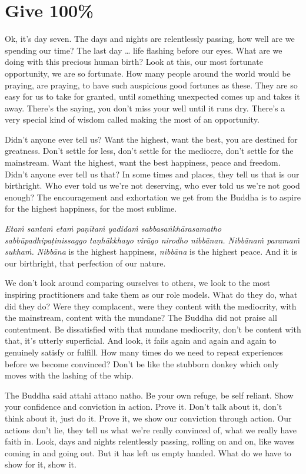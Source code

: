 \documentclass[12pt,openany]{book}
\begin{document}
\chapter*{Give 100\%}

Ok, it's day seven. The days and nights are relentlessly passing, how well are we spending our time? The last day … life flashing before our eyes. What are we doing with this precious human birth? Look at this, our most fortunate opportunity, we are so fortunate. How many people around the world would be praying, are praying, to have such auspicious good fortunes as these. They are so easy for us to take for granted, until something unexpected comes up and takes it away. There’s the saying, you don't miss your well until it runs dry. There's a very special kind of wisdom called making the most of an opportunity. 

Didn't anyone ever tell us? Want the highest, want the best, you are destined for greatness. Don't settle for less, don't settle for the mediocre, don’t settle for the mainstream. Want the highest, want the best happiness, peace and freedom. Didn’t anyone ever tell us that? In some times and places, they tell us that is our birthright. Who ever told us we're not deserving, who ever told us we're not good \linebreak enough? The encouragement and exhortation we get from the Buddha is to aspire for the highest happiness, for the most sublime.

\textit{Etaṁ santaṁ etaṁ paṇītaṁ yadidaṁ sabbasaṅkhārasamatho sabbūpadhipaṭinissaggo taṇhākkhayo virāgo nirodho nibbānan. Nibbānaṁ paramaṁ sukhaṁ. Nibbāna} is the highest happiness, \textit{nibbāna} is the highest peace. And it is our birthright, that perfection of our nature.

We don't look around comparing ourselves to others, we look to the most inspiring practitioners and take them as our role models. What do they do, what did they do? Were they complacent, were they content with the mediocrity, with the mainstream, content with the mundane? The Buddha did not praise all contentment. Be dissatisfied with that mundane mediocrity, don't be content with that, it’s utterly superficial. And look, it fails again and again and again to genuinely satisfy or fulfill. How many times do we need to repeat experiences before we become convinced? Don't be like the stubborn donkey which only moves with the lashing of the whip.

The Buddha said attahi attano natho. Be your own refuge, be self reliant. Show your confidence and conviction in action. Prove it. Don't talk about it, don't think about it, just do it. Prove it, we show our conviction through action. Our actions don't lie, they tell us what we’re really convinced of, what we really have faith in. Look, days and nights relentlessly passing, rolling on and on, like waves coming in and going out. But it has left us empty handed. What do we have to show for it, show it.
\end{document}
